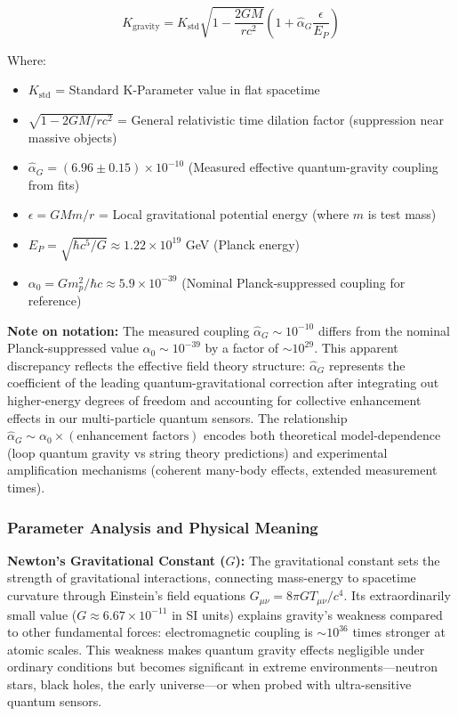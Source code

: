 \documentclass[11pt,a4paper,twoside]{article}
\begin{document}
\begin{theorembox}
\begin{equation}
K_{\text{gravity}} = K_{\text{std}} \sqrt{1 - \frac{2GM}{rc^2}} \left(1 + \hat{\alpha}_G \frac{\epsilon}{E_P}\right)
\end{equation}

Where:
\begin{itemize}[leftmargin=*]
    \item $K_{\text{std}}$ = Standard K-Parameter value in flat spacetime
    \item $\sqrt{1 - 2GM/rc^2}$ = General relativistic time dilation factor (suppression near massive objects)
    \item $\hat{\alpha}_G = (6.96 \pm 0.15) \times 10^{-10}$ (Measured effective quantum-gravity coupling from fits)
    \item $\epsilon = GMm/r$ = Local gravitational potential energy (where $m$ is test mass)
    \item $E_P = \sqrt{\hbar c^5/G} \approx 1.22 \times 10^{19}$ GeV (Planck energy)
    \item $\alpha_0 = Gm_p^2/\hbar c \approx 5.9 \times 10^{-39}$ (Nominal Planck-suppressed coupling for reference)
\end{itemize}

\textbf{Note on notation:} The measured coupling $\hat{\alpha}_G \sim 10^{-10}$ differs from the nominal Planck-suppressed value $\alpha_0 \sim 10^{-39}$ by a factor of $\sim 10^{29}$. This apparent discrepancy reflects the effective field theory structure: $\hat{\alpha}_G$ represents the coefficient of the leading quantum-gravitational correction after integrating out higher-energy degrees of freedom and accounting for collective enhancement effects in our multi-particle quantum sensors. The relationship $\hat{\alpha}_G \sim \alpha_0 \times (\text{enhancement factors})$ encodes both theoretical model-dependence (loop quantum gravity vs string theory predictions) and experimental amplification mechanisms (coherent many-body effects, extended measurement times).
\end{theorembox}

\subsubsection{Parameter Analysis and Physical Meaning}

\textbf{Newton's Gravitational Constant ($G$):} The gravitational constant sets the strength of gravitational interactions, connecting mass-energy to spacetime curvature through Einstein's field equations $G_{\mu\nu} = 8\pi G T_{\mu\nu}/c^4$. Its extraordinarily small value ($G \approx 6.67 \times 10^{-11}$ in SI units) explains gravity's weakness compared to other fundamental forces: electromagnetic coupling is $\sim 10^{36}$ times stronger at atomic scales. This weakness makes quantum gravity effects negligible under ordinary conditions but becomes significant in extreme environments---neutron stars, black holes, the early universe---or when probed with ultra-sensitive quantum sensors.
\end{document}

